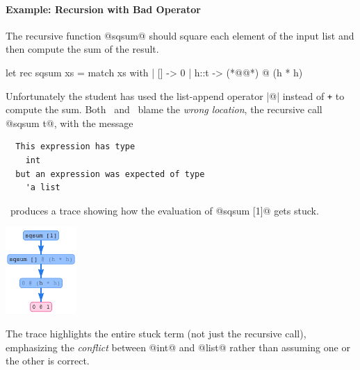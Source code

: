 \paragraph{Example: Recursion with Bad Operator}
The recursive function @sqsum@ should square each
element of the input list and then compute the sum
of the result.
%
\begin{ecode}
  let rec sqsum xs = match xs with
    | [] -> 0
    | h::t -> (*@@*) @ (h * h)
\end{ecode}
%
Unfortunately the student has used the list-append
operator |@| instead of \texttt{+} to compute the sum.
%
Both \ocaml\ and \sherrloc\ blame the \emph{wrong location},
the recursive call @sqsum t@, with the message
%
\begin{verbatim}
  This expression has type
    int
  but an expression was expected of type
    'a list
\end{verbatim}
%
\toolname\ produces a trace showing how the evaluation of
@sqsum [1]@ gets stuck.
%
\begin{center}
  \includegraphics[height=125px]{sqsum.png}
\end{center}
%
The trace highlights the entire stuck term
(not just the recursive call), emphasizing
the \emph{conflict} between @int@ and @list@
rather than assuming one or the other is correct.

